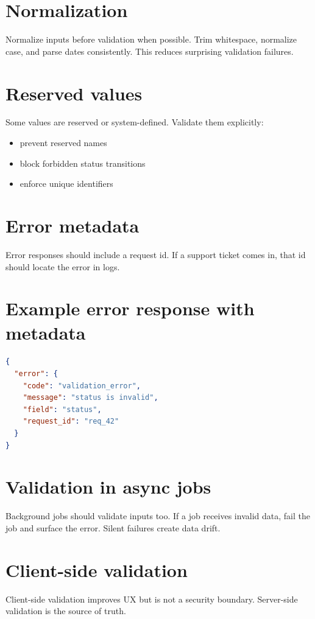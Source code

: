 \section{Normalization}
Normalize inputs before validation when possible.
Trim whitespace, normalize case, and parse dates consistently.
This reduces surprising validation failures.

\section{Reserved values}
Some values are reserved or system-defined.
Validate them explicitly:
\begin{itemize}[nosep]
  \item prevent reserved names
  \item block forbidden status transitions
  \item enforce unique identifiers
\end{itemize}

\section{Error metadata}
Error responses should include a request id.
If a support ticket comes in, that id should locate the error in logs.

\section{Example error response with metadata}
\begin{lstlisting}[language=JSON]
{
  "error": {
    "code": "validation_error",
    "message": "status is invalid",
    "field": "status",
    "request_id": "req_42"
  }
}
\end{lstlisting}

\section{Validation in async jobs}
Background jobs should validate inputs too.
If a job receives invalid data, fail the job and surface the error.
Silent failures create data drift.

\section{Client-side validation}
Client-side validation improves UX but is not a security boundary.
Server-side validation is the source of truth.

